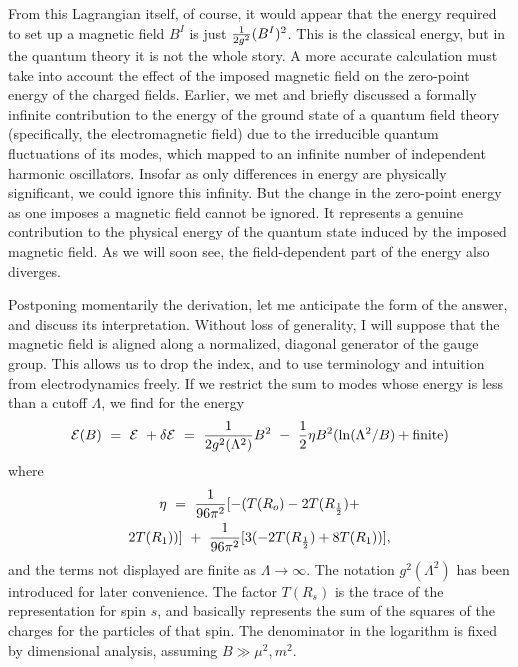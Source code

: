 \documentclass[12pt]{article}
\begin{document}
{}From this Lagrangian itself, of course, it would
appear that the energy required to set up a magnetic field $B^I$ is
just ${1\over 2 g^2} (B^I)^2$.  This is the classical energy, but in
the quantum theory it is not the whole story.  A more accurate
calculation must take into account the effect of the imposed magnetic
field on the zero-point energy of the charged fields.  Earlier, we met
and briefly discussed a formally infinite contribution to the energy
of the ground state of a quantum field theory (specifically, the
electromagnetic field) due to the irreducible quantum fluctuations of
its modes, which mapped to an infinite number of independent harmonic
oscillators.  Insofar as only differences in energy are physically
significant, we could ignore this infinity.  But the change in the
zero-point energy as one imposes a magnetic field cannot be ignored.
It represents a genuine contribution to the physical energy of the
quantum state induced by the imposed magnetic field.  As we will soon
see, the field-dependent part of the energy also diverges.  

Postponing
momentarily the derivation, let me anticipate the form of the answer,
and discuss its interpretation.  Without loss of generality, I will
suppose that the magnetic field is aligned along a normalized,
diagonal generator of the gauge group.  This allows us to drop the
index, and to use terminology and intuition from electrodynamics
freely.  If we restrict the sum to modes whose energy is less than a
cutoff $\Lambda$, we find for the energy
\begin{equation}{\cal E}(B)
~=~ {\cal E}~ + \delta {\cal E}~= ~ {1\over 2 g^2 (\Lambda^2) } B^2 ~-
~{1\over 2} \eta B^2 ( \ln (\Lambda^2/B) + {\rm finite} )
\label{eq:eng}
\end{equation}
where 
\begin{multline}\eta ~=~ {1\over 96
\pi^2} [ - (T(R_o) -2T(R_{1\over 2}) + \\
2T(R_1) ) ] ~+~ {1\over 96
\pi^2} [3(-2T(R_{1\over 2}) + 8T(R_1))],
\label{eq:lncoeff}
\end{multline}
and the terms not displayed are finite
as $\Lambda \rightarrow \infty$.  The notation $g^2(\Lambda^2)$ has
been introduced for later convenience.  The factor $T(R_s)$ is the
trace of the representation for spin $s$, and basically represents the
sum of the squares of the charges for the particles of that spin.  The
denominator in the logarithm is fixed by dimensional analysis,
assuming $B \gg \mu^2, m^2$.  
\end{document}
